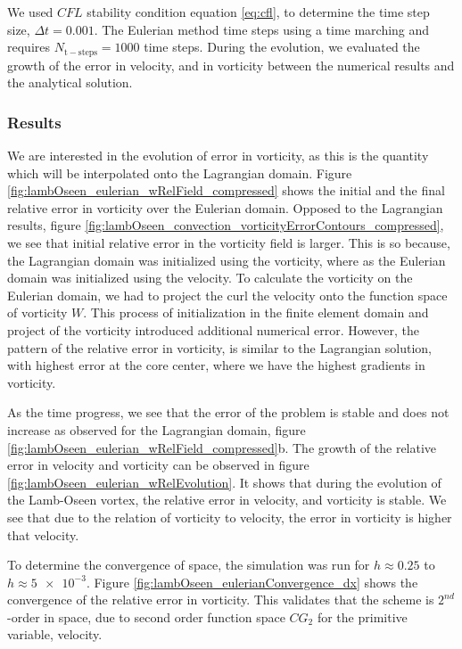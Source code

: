 We used $CFL$ stability condition equation \ref{eq:cfl}, to determine the time step size, $\Delta t = 0.001$. The Eulerian method time steps using a  time marching and requires $N_{\mathrm{t-steps}}=1000$ time steps. During the evolution, we evaluated the growth of the error in velocity, and in vorticity between the numerical results and the analytical solution. 

\subsubsection*{Results}
We are interested in the evolution of error in vorticity, as this is the quantity which will be interpolated onto the Lagrangian domain. Figure \ref{fig:lambOseen_eulerian_wRelField_compressed} shows the initial and the final relative error in vorticity over the Eulerian domain. Opposed to the Lagrangian results, figure \ref{fig:lambOseen_convection_vorticityErrorContours_compressed}, we see that initial relative error in the vorticity field is larger. This is so because, the Lagrangian domain was initialized using the vorticity, where as the Eulerian domain was initialized using the velocity. To calculate the vorticity on the Eulerian domain, we had to project the curl the velocity onto the function space of vorticity $W$. This process of initialization in the finite element domain and project of the vorticity introduced additional numerical error. However, the pattern of the relative error in vorticity, is similar to the Lagrangian solution, with highest error at the core center, where we have the highest gradients in vorticity.

As the time progress, we see that the error of the problem is stable and does not increase as observed for the Lagrangian domain, figure \ref{fig:lambOseen_eulerian_wRelField_compressed}b. The growth of the relative error in velocity and vorticity can be observed in figure \ref{fig:lambOseen_eulerian_wRelEvolution}. It shows that during the evolution of the Lamb-Oseen vortex, the relative error in velocity, and vorticity is stable. We see that due to the relation of vorticity to velocity, the error in vorticity is higher that velocity.

To determine the convergence of space, the simulation was run for $h \approx 0.25$ to $h \approx \num{5e-3}$. Figure \ref{fig:lambOseen_eulerianConvergence_dx} shows the convergence of the relative error in vorticity. This validates that the scheme is $2^{nd}$-order in space, due to second order function space $CG_2$ for the primitive variable, velocity.

